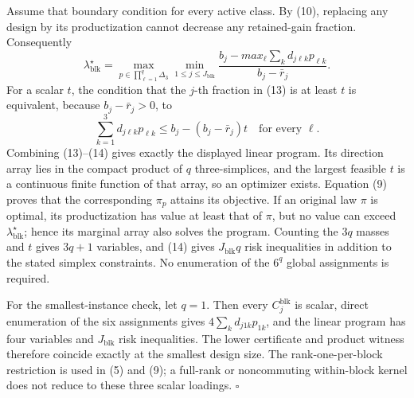 Assume that boundary condition for every active class.  By (10), replacing any design by its productization cannot decrease any retained-gain fraction.  Consequently
\[
\lambda_{\mathrm{blk}}^\star
=\max_{p\in\prod_{\ell=1}^q\Delta_3}
\min_{1\le j\le J_{\mathrm{blk}}}
\frac{b_j-max_\ell\sum_kd_{j\ell k}p_{\ell k}}
{b_j-\bar r_j}.
\tag{13}
\]
For a scalar \(t\), the condition that the \(j\)-th fraction in (13) is at least \(t\) is equivalent, because \(b_j-\bar r_j>0\), to
\[
\sum_{k=1}^3d_{j\ell k}p_{\ell k}
\le b_j-(b_j-\bar r_j)t
\quad\text{for every }\ell.
\tag{14}
\]
Combining (13)--(14) gives exactly the displayed linear program.  Its direction array lies in the compact product of \(q\) three-simplices, and the largest feasible \(t\) is a continuous finite function of that array, so an optimizer exists.  Equation (9) proves that the corresponding \(\pi_p\) attains its objective.  If an original law \(\pi\) is optimal, its productization has value at least that of \(\pi\), but no value can exceed \(\lambda_{\mathrm{blk}}^\star\); hence its marginal array also solves the program.  Counting the \(3q\) masses and \(t\) gives \(3q+1\) variables, and (14) gives \(J_{\mathrm{blk}}q\) risk inequalities in addition to the stated simplex constraints.  No enumeration of the \(6^q\) global assignments is required.

For the smallest-instance check, let \(q=1\).  Then every \(C_j^{\mathrm{blk}}\) is scalar, direct enumeration of the six assignments gives \(4\sum_kd_{j1k}p_{1k}\), and the linear program has four variables and \(J_{\mathrm{blk}}\) risk inequalities.  The lower certificate and product witness therefore coincide exactly at the smallest design size.  The rank-one-per-block restriction is used in (5) and (9); a full-rank or noncommuting within-block kernel does not reduce to these three scalar loadings. \(\square\)